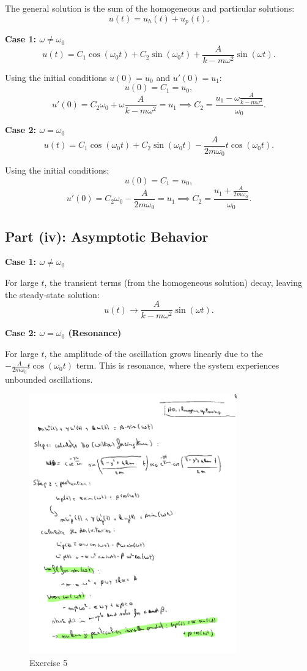 \documentclass[a4paper]{report}
\begin{document}
The general solution is the sum of the homogeneous and particular solutions:
\[
	u(t) = u_h(t) + u_p(t).
\]

\textbf{Case 1: \(\omega \neq \omega_0\)}
\[
	u(t) = C_1 \cos(\omega_0 t) + C_2 \sin(\omega_0 t) + \frac{A}{k - m \omega^2} \sin(\omega t).
\]

Using the initial conditions \(u(0) = u_0\) and \(u'(0) = u_1\):
\[
	u(0) = C_1 = u_0,
\]
\[
	u'(0) = C_2 \omega_0 + \omega \frac{A}{k - m \omega^2} = u_1 \implies C_2 = \frac{u_1 - \omega \frac{A}{k - m \omega^2}}{\omega_0}.
\]

\textbf{Case 2: \(\omega = \omega_0\)}
\[
	u(t) = C_1 \cos(\omega_0 t) + C_2 \sin(\omega_0 t) - \frac{A}{2m \omega_0} t \cos(\omega_0 t).
\]

Using the initial conditions:
\[
	u(0) = C_1 = u_0,
\]
\[
	u'(0) = C_2 \omega_0 - \frac{A}{2m \omega_0} = u_1 \implies C_2 = \frac{u_1 + \frac{A}{2m \omega_0}}{\omega_0}.
\]

\subsection*{Part (iv): Asymptotic Behavior}

\textbf{Case 1: \(\omega \neq \omega_0\)}

For large \(t\), the transient terms (from the homogeneous solution) decay, leaving the steady-state solution:
\[
	u(t) \to \frac{A}{k - m \omega^2} \sin(\omega t).
\]

\textbf{Case 2: \(\omega = \omega_0\) (Resonance)}

For large \(t\), the amplitude of the oscillation grows linearly due to the \(-\frac{A}{2m \omega_0} t \cos(\omega_0 t)\) term. This is resonance, where the system experiences unbounded oscillations.

\begin{figure}[H]
	\centering
	\includegraphics[width=0.8\textwidth]{assets/bord_8_ex_5.png}
	\caption{Exercise 5}
	\label{fig:bord_8_ex_5}
\end{figure}
\end{document}
